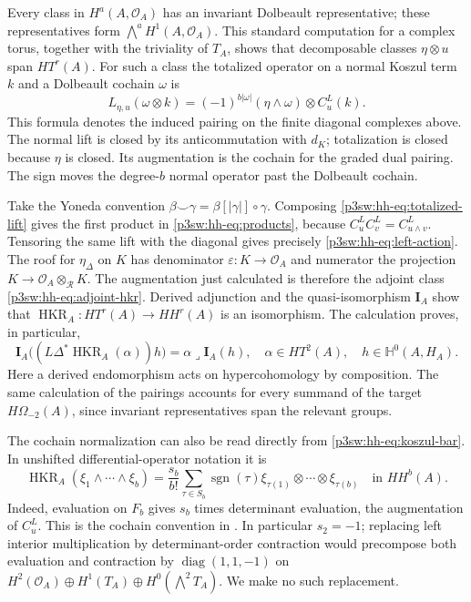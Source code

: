 \documentclass[11pt]{article}
\numberwithin{equation}{section}
\begin{document}
Every class in \(H^a(A,\mathcal O_A)\) has an invariant Dolbeault
representative; these representatives form
\(\bigwedge^aH^1(A,\mathcal O_A)\).  This standard computation for
a complex torus, together with the triviality of \(T_A\), shows that
decomposable classes \(\eta\otimes u\) span \(HT^r(A)\).
For such a class the totalized operator on a normal Koszul term \(k\)
and a Dolbeault cochain \(\omega\) is
\begin{equation}
 L_{\eta,u}(\omega\otimes k)
       =(-1)^{b|\omega|}(\eta\wedge\omega)\otimes C_u^L(k).
\label{p3sw:hh-eq:totalized-lift}
\end{equation}
This formula denotes the induced pairing on the finite diagonal
complexes above.  The normal lift is closed by its anticommutation
with \(d_K\); totalization is closed because \(\eta\) is closed.
Its augmentation is the cochain for the graded dual pairing.
The sign moves the degree-\(b\) normal operator past the Dolbeault
cochain.

Take the Yoneda convention
\(\beta\smile\gamma=\beta[|\gamma|]\circ\gamma\).
Composing \eqref{p3sw:hh-eq:totalized-lift} gives the first product
in \eqref{p3sw:hh-eq:products}, because
\(C_u^LC_v^L=C_{u\wedge v}^L\).  Tensoring the same lift with the
diagonal gives precisely \eqref{p3sw:hh-eq:left-action}.
The roof for \(\eta_\Delta\) on \(K\) has denominator
\(\varepsilon:K\to\mathcal O_A\) and numerator the projection
\(K\to\mathcal O_A\otimes_{\mathcal R}K\).  The augmentation just
calculated is therefore the adjoint class
\eqref{p3sw:hh-eq:adjoint-hkr}.  Derived adjunction and the
quasi-isomorphism \(\mathbf I_A\) show that
\(\operatorname{HKR}_A:HT^r(A)\to HH^r(A)\) is an isomorphism.
The calculation proves, in particular,
\begin{equation}
 \mathbf I_A\bigl((L\Delta^*\operatorname{HKR}_A(\alpha))h\bigr)
    =\alpha\mathbin{\lrcorner}\mathbf I_A(h),
 \quad
 \alpha\in HT^2(A),\quad h\in\mathbb H^0(A,H_A).
\label{p3sw:hh-eq:cap-hkr}
\end{equation}
Here a derived endomorphism acts on hypercohomology by composition.
The same calculation of the pairings accounts for every summand of
the target \(H\Omega_{-2}(A)\), since invariant representatives span
the relevant groups.

The cochain normalization can also be read directly from
\eqref{p3sw:hh-eq:koszul-bar}.  In unshifted differential-operator
notation it is
\begin{equation}
 \operatorname{HKR}_A(\xi_1\wedge\cdots\wedge\xi_b)
   =\frac{s_b}{b!}\sum_{\tau\in S_b}\operatorname{sgn}(\tau)
        \xi_{\tau(1)}\otimes\cdots\otimes\xi_{\tau(b)}
       \quad\text{in }HH^b(A).
\label{p3sw:hh-eq:cochain-sign}
\end{equation}
Indeed, evaluation on \(F_b\) gives \(s_b\) times determinant
evaluation, the augmentation of \(C_u^L\).
This is the cochain convention in
\cite[Equation~(3.20)]{P3HHCRVdB}.  In particular \(s_2=-1\);
replacing left interior multiplication by determinant-order
contraction would precompose both evaluation and contraction by
\(\operatorname{diag}(1,1,-1)\) on
\(H^2(\mathcal O_A)\oplus H^1(T_A)\oplus
H^0(\bigwedge^2T_A)\).  We make no such replacement.
\end{document}
